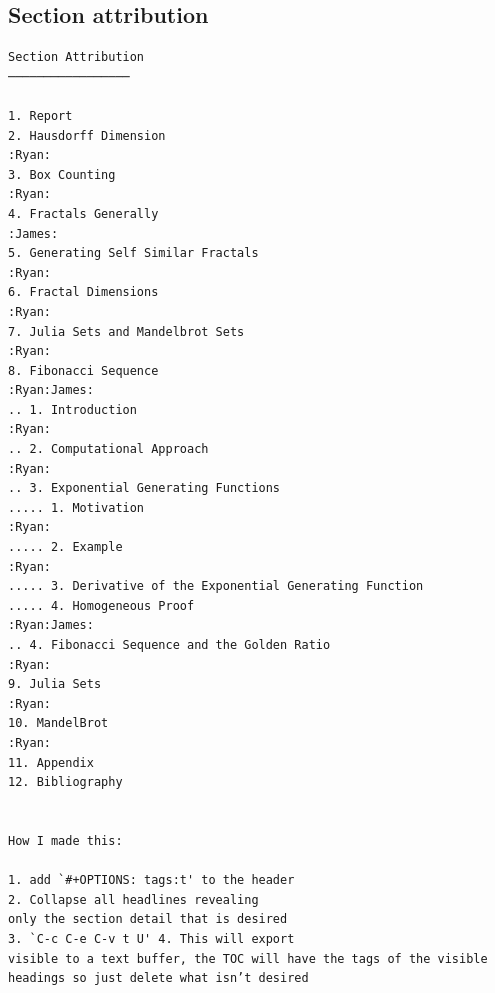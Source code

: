 \documentclass[11pt]{article}
\begin{document}
\subsection{Section attribution}
\label{sec:org56f09c9}
\begin{verbatim}
Section Attribution
─────────────────

1. Report
2. Hausdorff Dimension                                            :Ryan:
3. Box Counting                                                   :Ryan:
4. Fractals Generally                                            :James:
5. Generating Self Similar Fractals                               :Ryan:
6. Fractal Dimensions                                             :Ryan:
7. Julia Sets and Mandelbrot Sets                                 :Ryan:
8. Fibonacci Sequence                                       :Ryan:James:
.. 1. Introduction                                                :Ryan:
.. 2. Computational Approach                                      :Ryan:
.. 3. Exponential Generating Functions
..... 1. Motivation                                               :Ryan:
..... 2. Example                                                  :Ryan:
..... 3. Derivative of the Exponential Generating Function
..... 4. Homogeneous Proof                                  :Ryan:James:
.. 4. Fibonacci Sequence and the Golden Ratio                     :Ryan:
9. Julia Sets                                                     :Ryan:
10. MandelBrot                                                    :Ryan:
11. Appendix
12. Bibliography


How I made this:

1. add `#+OPTIONS: tags:t' to the header
2. Collapse all headlines revealing
only the section detail that is desired
3. `C-c C-e C-v t U' 4. This will export
visible to a text buffer, the TOC will have the tags of the visible
headings so just delete what isn’t desired
\end{verbatim}
\end{document}
